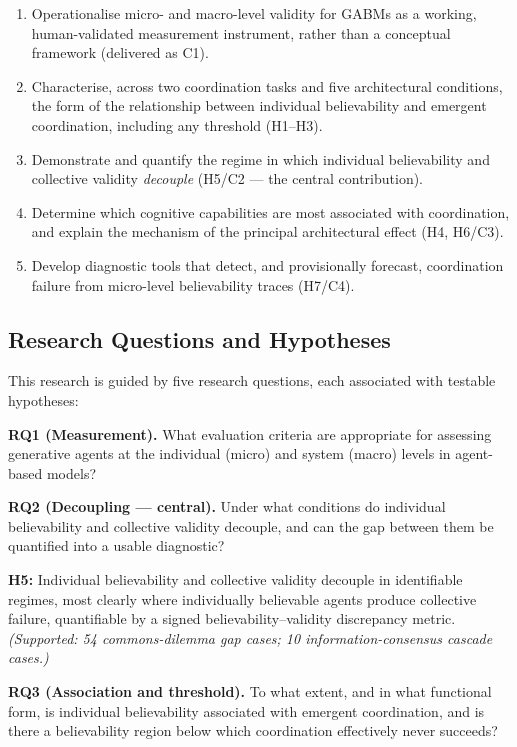 \documentclass[11pt]{article}
\begin{document}
\begin{enumerate}
    \item Operationalise micro- and macro-level validity for GABMs as a working, human-validated measurement instrument, rather than a conceptual framework (delivered as C1).
    \item Characterise, across two coordination tasks and five architectural conditions, the form of the relationship between individual believability and emergent coordination, including any threshold (H1--H3).
    \item Demonstrate and quantify the regime in which individual believability and collective validity \emph{decouple} (H5/C2 --- the central contribution).
    \item Determine which cognitive capabilities are most associated with coordination, and explain the mechanism of the principal architectural effect (H4, H6/C3).
    \item Develop diagnostic tools that detect, and provisionally forecast, coordination failure from micro-level believability traces (H7/C4).
\end{enumerate}

\subsection{Research Questions and Hypotheses}
This research is guided by five research questions, each associated with testable hypotheses:

\textbf{RQ1 (Measurement).} What evaluation criteria are appropriate for assessing generative agents at the individual (micro) and system (macro) levels in agent-based models?

\textbf{RQ2 (Decoupling --- central).} Under what conditions do individual believability and collective validity decouple, and can the gap between them be quantified into a usable diagnostic?

\textbf{H5:} Individual believability and collective validity decouple in identifiable regimes, most clearly where individually believable agents produce collective failure, quantifiable by a signed believability--validity discrepancy metric. \emph{(Supported: 54 commons-dilemma gap cases; 10 information-consensus cascade cases.)}

\textbf{RQ3 (Association and threshold).} To what extent, and in what functional form, is individual believability associated with emergent coordination, and is there a believability region below which coordination effectively never succeeds?
\end{document}
